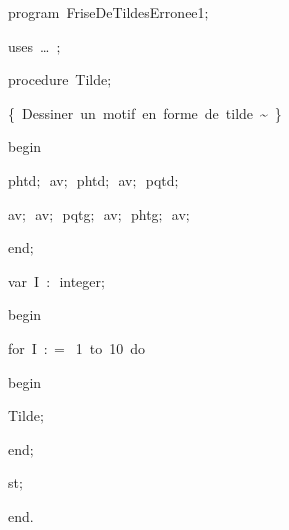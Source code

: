 
{
\parindent {}
\medskip

\carrenoir
\vspace{\neglskip}\mbox{\blc  \idt  \mcl program\idt \ FriseDeTildesErronee1$;$
}\par 
\vspace{\neglskip}\mbox{\blc \blk\idt \mcl uses\idt \ \ldots\ $;$
}\par 
\medskip

\pagebreak[3] 
\vspace{\neglskip}\mbox{\blc  \blk\idt  \mcl procedure\idt \ Tilde$;$}\par 
\vspace{\neglskip}\mbox{\blc  \blk\blk\idt  \cmt  \{\ Dessiner\ un\ motif\ en\ forme\ de\ tilde\ \~{ }\ \}\idt }\par 
\vspace{\neglskip}\mbox{\blc  \blk\idt  \mcl begin\idt }\par 
\vspace{\neglskip}\mbox{\blc  \blk\blk\idt  phtd$;$\ av$;$\ phtd$;$\ av$;$\ pqtd$;$\ }\par 
\vspace{\neglskip}\mbox{\blc  \blk\blk\idt  av$;$\ av$;$\ pqtg$;$\ av$;$\ phtg$;$\ av$;$}\par 
\vspace{\neglskip}\mbox{\blc  \blk\idt  \mcl end\idt $;$}\par 
\medskip

\pagebreak[3] 
\vspace{\neglskip}\mbox{\blc  \blk\idt  \mcl var\idt \ I\ $:$\ integer$;$}\par 
\medskip

\vspace{\neglskip}\mbox{\blc  \idt  \mcl begin\idt }\par 
\pagebreak[3] 
\vspace{\neglskip}\mbox{\blc  \blk\idt  \mcl for\idt \ I\ $:$$=$\ 1\ \mcl to\idt \ 10\ \mcl do\idt }\par 
\vspace{\neglskip}\mbox{\blc  \blk\blk\idt  \mcl begin\idt }\par 
\vspace{\neglskip}\mbox{\blc  \blk\blk\blk\idt  Tilde$;$}\par 
\vspace{\neglskip}\mbox{\blc  \blk\blk\idt  \mcl end\idt $;$}\par 
\vspace{\neglskip}\mbox{\blc  \blk\idt  st$;$}\par 
\vspace{\neglskip}\mbox{\blc  \idt  \mcl end\idt $.$}\par 

\medskip }

